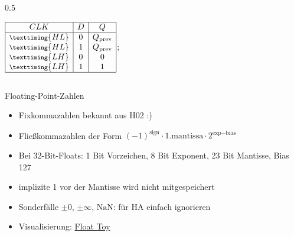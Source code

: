\begin{frame}[c]
\begin{columns}[c]
\begin{column}{0.5\textwidth}
\begin{center}
\begin{circuitikz}
{						$\displaystyle
							\begin{array}{|c|c|c|}
								\hline
								CLK                            & D & Q                 \\
								\hline
								\footnotesize{\texttiming{HL}} & 0 & Q_{\textrm{prev}} \\
								\footnotesize{\texttiming{HL}} & 1 & Q_{\textrm{prev}} \\
								\footnotesize{\texttiming{LH}} & 0 & 0                 \\
								\footnotesize{\texttiming{LH}} & 1 & 1                 \\
								\hline
							\end{array}
						$};
				\end{circuitikz}
			\end{center}
		\end{column}
	\end{columns}
\end{frame}

\begin{frame}[c]{Floating-Point-Zahlen}
	\begin{itemize}
		\item Fixkommazahlen bekannt aus H02 :)
		\item Fließkommazahlen der Form $(-1)^{\textrm{sign}}\cdot 1.\textrm{mantissa}\cdot 2^{\textrm{exp}-\textrm{bias}}$
	\end{itemize}
	\begin{center}
	\end{center}
	\begin{itemize}
		\item Bei 32-Bit-Floats: 1 Bit Vorzeichen, 8 Bit Exponent, 23 Bit Mantisse, Bias 127
		\item implizite 1 vor der Mantisse wird nicht mitgespeichert
		\item Sonderfälle $\pm0$, $\pm\infty$, $\textrm{NaN}$: für HA einfach ignorieren
		\item Visualisierung: \href{https://evanw.github.io/float-toy/}{Float Toy}
	\end{itemize}
\end{frame}

